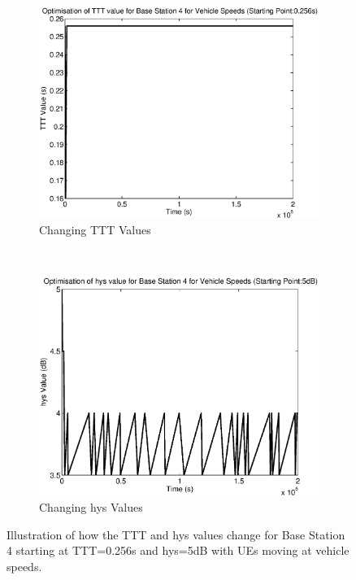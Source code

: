 \begin{figure}[H]
        \centering
        \begin{subfigure}[b]{0.49\textwidth}
                \includegraphics[width=\textwidth]{figures/graphs/vehmid/TTT4.eps}
                \caption{Changing TTT Values}
        \end{subfigure}%
        ~ %
        \begin{subfigure}[b]{0.49\textwidth}
                \includegraphics[width=\textwidth]{figures/graphs/vehmid/hys4.eps}
                \caption{Changing hys Values}
        \end{subfigure}
        \caption{Illustration of how the TTT and hys values change for Base Station 4 starting at TTT=0.256s and hys=5dB with UEs moving at vehicle speeds.}
\end{figure}
